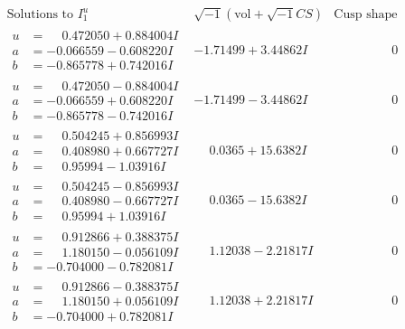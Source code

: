 \documentclass[1p]{elsarticle_modified}
\theoremstyle{definition}
\newcommand{\I}{\sqrt{-1}}
\begin{document}
$$\begin{array}{c|c|c}  
\text{Solutions to }I^u_{1}& \I (\text{vol} + \sqrt{-1}CS) & \text{Cusp shape}\\
 \hline 
\begin{aligned}
u &= \phantom{-}0.472050 + 0.884004 I \\
a &= -0.066559 - 0.608220 I \\
b &= -0.865778 + 0.742016 I\end{aligned}
 & -1.71499 + 3.44862 I & \phantom{-0.000000 } 0 \\ \hline\begin{aligned}
u &= \phantom{-}0.472050 - 0.884004 I \\
a &= -0.066559 + 0.608220 I \\
b &= -0.865778 - 0.742016 I\end{aligned}
 & -1.71499 - 3.44862 I & \phantom{-0.000000 } 0 \\ \hline\begin{aligned}
u &= \phantom{-}0.504245 + 0.856993 I \\
a &= \phantom{-}0.408980 + 0.667727 I \\
b &= \phantom{-}0.95994 - 1.03916 I\end{aligned}
 & \phantom{-}0.0365 + 15.6382 I & \phantom{-0.000000 } 0 \\ \hline\begin{aligned}
u &= \phantom{-}0.504245 - 0.856993 I \\
a &= \phantom{-}0.408980 - 0.667727 I \\
b &= \phantom{-}0.95994 + 1.03916 I\end{aligned}
 & \phantom{-}0.0365 - 15.6382 I & \phantom{-0.000000 } 0 \\ \hline\begin{aligned}
u &= \phantom{-}0.912866 + 0.388375 I \\
a &= \phantom{-}1.180150 - 0.056109 I \\
b &= -0.704000 - 0.782081 I\end{aligned}
 & \phantom{-}1.12038 - 2.21817 I & \phantom{-0.000000 } 0 \\ \hline\begin{aligned}
u &= \phantom{-}0.912866 - 0.388375 I \\
a &= \phantom{-}1.180150 + 0.056109 I \\
b &= -0.704000 + 0.782081 I\end{aligned}
 & \phantom{-}1.12038 + 2.21817 I & \phantom{-0.000000 } 0 \\ \hline\begin{aligned}

\end{aligned}
\end{array}$$
\end{document}
